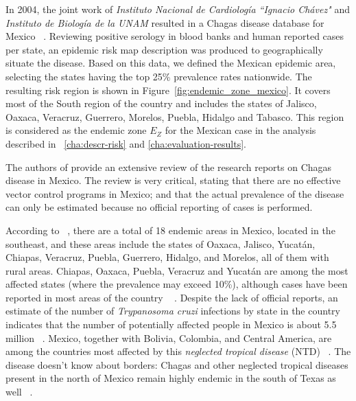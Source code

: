 In 2004, the joint work of \textit{Instituto Nacional de Cardiología ``Ignacio Chávez"} and  \textit{Instituto de Biología de la UNAM} resulted in a Chagas disease database for Mexico~ \textcite{cruz2006chagmex}. Reviewing positive serology in blood banks and human reported cases per state, an epidemic risk map description was produced to geographically situate the disease. Based on this data, we defined the Mexican epidemic area, selecting the states having the top 25\% prevalence rates nationwide. The resulting risk region is shown in Figure~\cref{fig:endemic_zone_mexico}. It covers most of the South region of the country and includes the states of Jalisco, Oaxaca, Veracruz, Guerrero, Morelos, Puebla, Hidalgo and Tabasco.
This region is considered as the endemic zone $E_Z$ for the Mexican case in the analysis described in ~\cref{cha:descr-risk} and \cref{cha:evaluation-results}.



The authors of  \textcite{carabarin2013chagas} provide an extensive review of the 
research reports on Chagas disease in Mexico.
The review is very critical, stating that there are no effective vector control programs in Mexico;
and that the actual prevalence of the disease 
can only be estimated because no official reporting of cases is performed.

According to~  \textcite{dumonteil1999update}, 
there are a total of 18 endemic areas in Mexico, located in the southeast, and
these areas include the states of Oaxaca, Jalisco, Yucatán, Chiapas, Veracruz,
Puebla, Guerrero, Hidalgo, and Morelos, all of them with rural areas.
Chiapas, Oaxaca, Puebla, Veracruz and Yucatán are among the most affected states (where the prevalence may exceed 10\%), although cases have been reported in most areas of the country
~ \textcite{cruz2006chagmex,dumonteil1999update}.
Despite the lack of official reports, an estimate of the number of \textit{Trypanosoma cruzi} infections by state in the country
indicates that the number of potentially
affected people in Mexico is about 5.5 million~ \textcite{carabarin2013chagas}.
Mexico, together with Bolivia, Colombia, and Central
America, are among the countries most affected by this 
\textit{neglected tropical disease} (NTD)~ \textcite{hotez2013innovation}.
The disease doesn't know about borders:
Chagas and other neglected tropical diseases present in the north of Mexico remain highly endemic in the south of Texas as well~ \textcite{hotez2012texas}.

